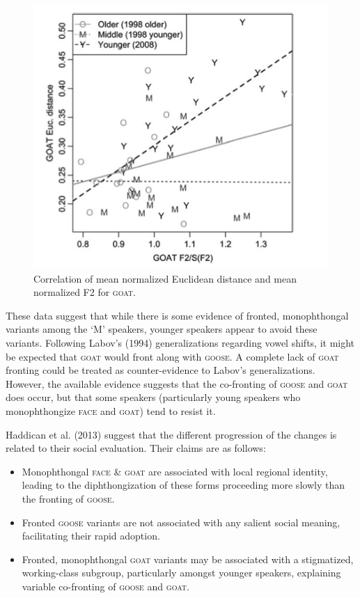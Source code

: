 \documentclass{article}
\begin{document}
\begin{figure}[ht!]
\centering
\includegraphics[scale=0.6]{goat_correlation.png}
\caption{Correlation of mean normalized Euclidean distance and  mean normalized F2 for \textsc{goat}.}
\end{figure}

These data suggest that while there is some evidence of fronted, monophthongal variants among the `M' speakers, younger speakers appear to avoid these variants. Following Labov's (1994) generalizations regarding vowel shifts, it might be expected that \textsc{goat} would front along with \textsc{goose}. A complete lack of \textsc{goat} fronting could be treated as counter-evidence to Labov's generalizations. However, the available evidence suggests that the co-fronting of \textsc{goose} and \textsc{goat} does occur, but that some speakers (particularly young speakers who monophthongize \textsc{face} and \textsc{goat}) tend to resist it.  

Haddican et al. (2013) suggest that the different progression of the changes is related to their social evaluation. Their claims are as follows:

\begin{itemize}
\item{Monophthongal \textsc{face} \& \textsc{goat} are associated with local regional identity, leading to the diphthongization of these forms proceeding more slowly than the fronting of \textsc{goose}.}
\item{Fronted \textsc{goose} variants are not associated with any salient social meaning, facilitating their rapid adoption.}
\item{Fronted, monophthongal \textsc{goat} variants may be associated with a stigmatized, working-class subgroup, particularly amongst younger speakers, explaining variable co-fronting of \textsc{goose} and \textsc{goat}.}
\end{itemize}
\end{document}
